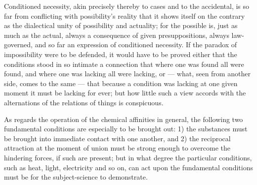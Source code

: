 \documentclass[12pt,a4paper]{book}
\begin{document}
Conditioned necessity, akin precisely thereby to cases and to the accidental,
is so far from conflicting with possibility's reality that it shows itself on
the contrary as the dialectical unity of possibility and actuality; for the
possible is, just as much as the actual, always a consequence of given
presuppositions, always law-governed, and so far an expression of conditioned
necessity. If the paradox of impossibility were to be defended, it would have
to be proved either that the conditions stood in so intimate a connection that
where one was found all were found, and where one was lacking all were lacking,
or --- what, seen from another side, comes to the same --- that because a
condition was lacking at
one given
moment it must be lacking for ever; but how little such a view accords with the
alternations of the relations of things is conspicuous.

As regards the operation of the chemical affinities in general, the following
two fundamental conditions are especially to be brought out: 1) the substances
must be brought into immediate contact with one another, and 2) the reciprocal
attraction at the moment of union must be strong enough to overcome the
hindering forces, if such are present; but in what degree the particular
conditions, such as heat, light, electricity and so on, can act upon the
fundamental conditions must be for the subject-science to demonstrate.
\end{document}
